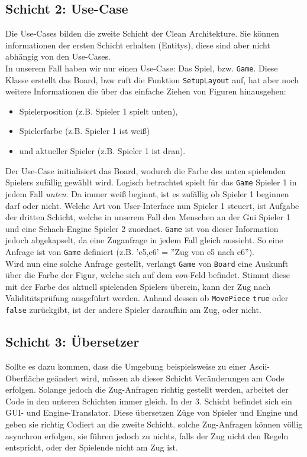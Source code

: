\documentclass[
10pt, %
a4paper, %
oneside, %
headinclude,footinclude, %
BCOR5mm, %
]{scrartcl}
\begin{document}
\subsection{Schicht 2: Use-Case}
Die Use-Cases bilden die zweite Schicht der Clean Architekture. Sie können informationen der ersten Schicht erhalten (Entitys), diese sind aber nicht abhängig von den Use-Cases.\\
In unserem Fall haben wir nur einen Use-Case: Das Spiel, bzw. \texttt{Game}. Diese Klasse erstellt das Board, bzw ruft die Funktion \texttt{SetupLayout} auf, hat aber noch weitere Informationen die über das einfache Ziehen von Figuren hinausgehen:
\begin{center}
	\begin{itemize}
		\item Spielerposition (z.B. Spieler 1 spielt unten),
		\item Spielerfarbe (z.B. Spieler 1 ist weiß)
		\item und aktueller Spieler (z.B. Spieler 1 ist dran).
	\end{itemize}
\end{center}
Der Use-Case initialisiert das Board, wodurch die Farbe des unten spielenden Spielers zufällig gewählt wird. Logisch betrachtet spielt für das \texttt{Game} Spieler 1 in jedem Fall \textit{unten}. Da immer weiß beginnt, ist es zufällig ob Spieler 1 beginnen darf oder nicht. Welche Art von User-Interface nun Spieler 1 steuert, ist Aufgabe der dritten Schicht, welche in unserem Fall den Menschen an der Gui Spieler 1 und eine Schach-Engine Spieler 2 zuordnet. \texttt{Game} ist von dieser Information jedoch abgekapselt, da eine Zuganfrage in jedem Fall gleich aussieht.
So eine Anfrage ist von \texttt{Game} definiert (z.B. 'e5,e6' = ''Zug von e5 nach e6''). \\
Wird nun eine solche Anfrage gestellt, verlangt \texttt{Game} von \texttt{Board} eine Auskunft über die Farbe der Figur, welche sich auf dem \textit{von}-Feld befindet. Stimmt diese mit der Farbe des aktuell spielenden Spielers überein, kann der Zug nach Validitätsprüfung ausgeführt werden. Anhand dessen ob \texttt{MovePiece} \texttt{true} oder \texttt{false} zurückgibt, ist der andere Spieler daraufhin am Zug, oder nicht.
\subsection{Schicht 3: Übersetzer}
Sollte es dazu kommen, dass die Umgebung beispielsweise zu einer Ascii-Oberfläche geändert wird, müssen ab dieser Schicht Veränderungen am Code erfolgen. Solange jedoch die Zug-Anfragen richtig gestellt werden, arbeitet der Code in den unteren Schichten immer gleich. In der 3. Schicht befindet sich ein GUI- und Engine-Translator. Diese übersetzen Züge von Spieler und Engine und geben sie richtig Codiert an die zweite Schicht. solche Zug-Anfragen können völlig asynchron erfolgen, sie führen jedoch zu nichts, falls der Zug nicht den Regeln entspricht, oder der Spielende nicht am Zug ist.
\end{document}
